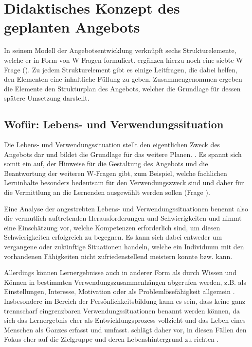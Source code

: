 \documentclass[
  twoside,
  parskip=half-,
  paper=176mm:246mm,
  BCOR=14mm,
  DIV=14,
]{scrreprt}
\begin{document}
\chapter{Didaktisches Konzept des geplanten Angebots}\label{chapter:didaktischeskonzept}

In seinem Modell der Angebotsentwicklung verknüpft \citeauthor{schlutz} sechs Strukturelemente, welche er in Form von W-Fragen formuliert. \citeauthor{fleige} ergänzen hierzu noch eine siebte W-Frage (). Zu jedem Strukturelement gibt es einige Leitfragen, die dabei helfen, den Elementen eine inhaltliche Füllung zu geben. Zusammengenommen ergeben die Elemente den Strukturplan des Angebots, welcher die Grundlage für dessen spätere Umsetzung darstellt. 

\section{Wofür: Lebens- und Verwendungssituation}
Die Lebens- und Verwendungssituation stellt den eigentlichen Zweck des Angebots dar und bildet die Grundlage für das weitere Planen. . Es spannt sich somit ein  auf, der Hinweise für die Gestaltung des Angebots und die Beantwortung der weiteren W-Fragen gibt, zum Beispiel, welche fachlichen Lerninhalte besonders bedeutsam für den Verwendungszweck sind und daher für die Vermittlung an die Lernenden ausgewählt werden sollen (Frage ).

Eine Analyse der angestrebten Lebens- und Verwendungssituationen benennt also die vermutlich auftretenden Herausforderungen und Schwierigkeiten und nimmt eine Einschätzung vor, welche Kompetenzen erforderlich sind, um diesen Schwierigkeiten erfolgreich zu begegnen. Es kann sich dabei entweder um vergangene oder zukünftige Situationen handeln, welche ein Individuum mit den vorhandenen Fähigkeiten nicht zufriedenstellend meistern konnte bzw. kann.

Allerdings können Lernergebnisse auch in anderer Form als durch Wissen und Können in bestimmten Verwendungszusammenhängen abgerufen werden, z.B. als Einstellungen, Interesse, Motivation oder als Problemlösefähigkeit allgemein \autocite[vgl.][94]{schlutz}. Insbesondere im Bereich der Persönlichkeitsbildung kann es sein, dass keine ganz trennscharf eingrenzbaren Verwendungssituationen benannt werden können, da sich das Lernergebnis eher als Entwicklungsprozess vollzieht und das Leben eines Menschen als Ganzes erfasst und umfasst. \citeauthor{schlutz} schlägt daher vor, in diesen Fällen den Fokus eher auf die Zielgruppe und deren Lebenshintergrund zu richten \autocite[vgl.][94]{schlutz}. 
\end{document}
